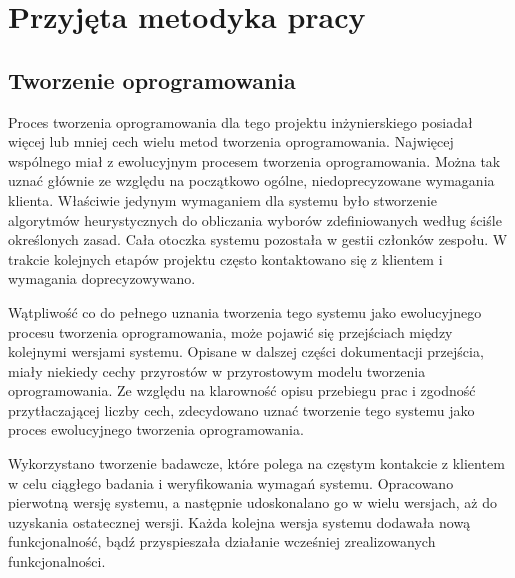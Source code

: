 \documentclass[pdflatex,11pt]{../aghdoc_version2}
\newlength\tindent
\renewcommand{\indent}{\hspace*{\tindent}}
\begin{document}
\chapter{Przyjęta metodyka pracy}
\section{Tworzenie oprogramowania}
Proces tworzenia oprogramowania dla tego projektu inżynierskiego posiadał więcej lub mniej
cech wielu metod tworzenia oprogramowania. Najwięcej wspólnego miał z ewolucyjnym
procesem tworzenia oprogramowania. Można tak uznać głównie ze względu na początkowo
ogólne, niedoprecyzowane wymagania klienta. Właściwie jedynym wymaganiem dla
systemu było stworzenie algorytmów heurystycznych do obliczania wyborów zdefiniowanych
według ściśle określonych zasad. Cała otoczka systemu pozostała w gestii członków
zespołu. W trakcie kolejnych etapów projektu często kontaktowano się z klientem i
wymagania doprecyzowywano. 

\indent Wątpliwość co do pełnego uznania tworzenia tego systemu
jako ewolucyjnego procesu tworzenia oprogramowania, może pojawić się przejściach
między kolejnymi wersjami systemu. Opisane w dalszej części dokumentacji przejścia, miały niekiedy cechy przyrostów w przyrostowym modelu tworzenia oprogramowania. Ze względu na klarowność opisu przebiegu prac i zgodność przytłaczającej liczby cech, zdecydowano uznać tworzenie tego systemu jako proces
ewolucyjnego tworzenia oprogramowania.

\indent Wykorzystano tworzenie badawcze, które polega na częstym kontakcie z klientem w celu
ciągłego badania i weryfikowania wymagań systemu. Opracowano pierwotną wersję
systemu, a następnie udoskonalano go w wielu wersjach, aż do uzyskania ostatecznej
wersji. Każda kolejna wersja systemu dodawała nową funkcjonalność, bądź przyspieszała
działanie wcześniej zrealizowanych funkcjonalności.
\end{document}
